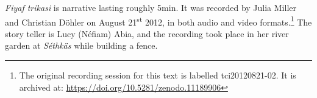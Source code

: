 \textit{Fiyaf trikasi} is narrative lasting roughly 5min. It was recorded by Julia Miller and Christian Döhler on August 21\textsuperscript{st} 2012, in both audio and video formats.\footnote{The original recording session for this text is labelled tci20120821-02. It is archived at: \href{https://doi.org/10.5281/zenodo.11189906}{https://doi.org/10.5281/zenodo.11189906}} The story teller is Lucy (Néfiam) Abia, and the recording took place in her river garden at \textit{Séthkäs} while building a fence.